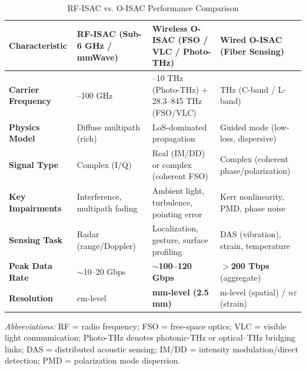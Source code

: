 \documentclass[lettersize,journal]{IEEEtran}
\begin{document}
\begin{table}[!t]
\caption{RF-ISAC vs. O-ISAC Performance Comparison \protect\cite{O_ISAC_021}}
\label{tab:performance_comparison}
\centering
\footnotesize
\setlength{\tabcolsep}{3.2pt}
\renewcommand{\arraystretch}{1.15}

\begin{tabularx}{\textwidth}{@{}%
>{\raggedright\arraybackslash}p{2.35cm}
>{\raggedright\arraybackslash}X
>{\raggedright\arraybackslash}X
>{\raggedright\arraybackslash}X
@{}}
\toprule
\textbf{Characteristic} &
\textbf{RF-ISAC (Sub-6 GHz / mmWave)} &
\textbf{Wireless O-ISAC (FSO / VLC / Photo-THz)} &
\textbf{Wired O-ISAC (Fiber Sensing)} \\
\midrule

\textbf{Carrier Frequency} &
2.4--100 GHz &
0.1--10 THz (Photo-THz) + 28.3--845 THz (FSO/VLC) &
193 THz (C-band / L-band) \\

\textbf{Physics Model} &
Diffuse multipath (rich) &
LoS-dominated propagation &
Guided mode (low-loss, dispersive) \\

\textbf{Signal Type} &
Complex (I/Q) &
Real (IM/DD) or complex (coherent FSO) &
Complex (coherent phase/polarization) \\

\textbf{Key Impairments} &
Interference, multipath fading &
Ambient light, turbulence, pointing error &
Kerr nonlinearity, PMD, phase noise \\

\textbf{Sensing Task} &
Radar (range/Doppler) &
Localization, gesture, surface profiling &
DAS (vibration), strain, temperature \\

\textbf{Peak Data Rate} &
$\sim$10--20 Gbps &
\textbf{$\sim$100--120 Gbps} \cite{O_ISAC_105} &
\textbf{$>$200 Tbps} (aggregate) \cite{O_ISAC_046} \\

\textbf{Resolution} &
cm-level &
\textbf{mm-level (2.5 mm)} \cite{O_ISAC_105} &
m-level (spatial) / $n\varepsilon$ (strain) \\
\bottomrule
\end{tabularx}

\vspace{2pt}
\footnotesize
\emph{Abbreviations:} RF = radio frequency; FSO = free-space optics; VLC = visible light communication; 
Photo-THz denotes photonic-THz or optical--THz bridging links; DAS = distributed acoustic sensing; 
IM/DD = intensity modulation/direct detection; PMD = polarization mode dispersion.
\end{table}
\end{document}
